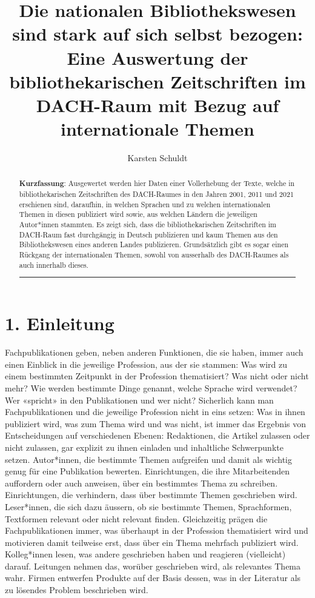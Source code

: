 \documentclass[a4paper,
fontsize=11pt,
oneside,
numbers=noperiodatend,
parskip=half-,
bibliography=totoc,
final
]{scrartcl}
\title{\LARGE{Die nationalen Bibliothekswesen sind stark auf sich selbst bezogen: Eine Auswertung der bibliothekarischen Zeitschriften im DACH-Raum mit Bezug auf internationale Themen}}%
\author{Karsten Schuldt} %
\date{}
\begin{document}
\maketitle
\thispagestyle{fancyplain} 

\begin{abstract}
\noindent
\textbf{Kurzfassung}: Ausgewertet werden hier Daten einer Vollerhebung
der Texte, welche in bibliothekarischen Zeitschriften des DACH-Raumes in
den Jahren 2001, 2011 und 2021 erschienen sind, daraufhin, in welchen
Sprachen und zu welchen internationalen Themen in diesen publiziert wird
sowie, aus welchen Ländern die jeweiligen Autor*innen stammten. Es zeigt
sich, dass die bibliothekarischen Zeitschriften im DACH-Raum fast
durchgängig in Deutsch publizieren und kaum Themen aus den
Bibliothekswesen eines anderen Landes publizieren. Grundsätzlich gibt es
sogar einen Rückgang der internationalen Themen, sowohl von ausserhalb
des DACH-Raumes als auch innerhalb dieses.

\begin{center}\rule{0.5\linewidth}{0.5pt}\end{center}
\end{abstract}

\hypertarget{einleitung}{%
\section{1. Einleitung}\label{einleitung}}

Fachpublikationen geben, neben anderen Funktionen, die sie haben, immer
auch einen Einblick in die jeweilige Profession, aus der sie stammen:
Was wird zu einem bestimmten Zeitpunkt in der Profession thematisiert?
Was nicht oder nicht mehr? Wie werden bestimmte Dinge genannt, welche
Sprache wird verwendet? Wer «spricht» in den Publikationen und wer
nicht? Sicherlich kann man Fachpublikationen und die jeweilige
Profession nicht in eins setzen: Was in ihnen publiziert wird, was zum
Thema wird und was nicht, ist immer das Ergebnis von Entscheidungen auf
verschiedenen Ebenen: Redaktionen, die Artikel zulassen oder nicht
zulassen, gar explizit zu ihnen einladen und inhaltliche Schwerpunkte
setzen. Autor*innen, die bestimmte Themen aufgreifen und damit als
wichtig genug für eine Publikation bewerten. Einrichtungen, die ihre
Mitarbeitenden auffordern oder auch anweisen, über ein bestimmtes Thema
zu schreiben. Einrichtungen, die verhindern, dass über bestimmte Themen
geschrieben wird. Leser*innen, die sich dazu äussern, ob sie bestimmte
Themen, Sprachformen, Textformen relevant oder nicht relevant finden.
Gleichzeitig prägen die Fachpublikationen immer, was überhaupt in der
Profession thematisiert wird und motivieren damit teilweise erst, dass
über ein Thema mehrfach publiziert wird. Kolleg*innen lesen, was andere
geschrieben haben und reagieren (vielleicht) darauf. Leitungen nehmen
das, worüber geschrieben wird, als relevantes Thema wahr. Firmen
entwerfen Produkte auf der Basis dessen, was in der Literatur als zu
lösendes Problem beschrieben wird.
\end{document}
